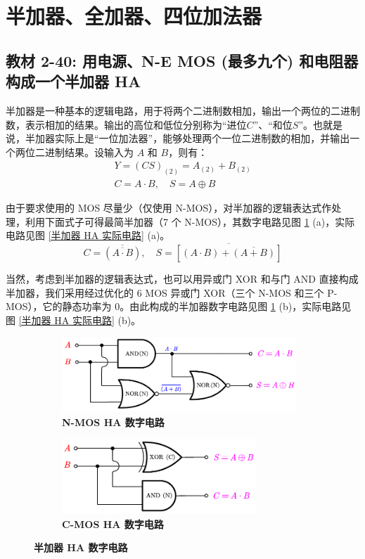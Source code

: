 \documentclass[UTF8]{report}
\theoremstyle{MyLineTheoremStyle} %
\theoremstyle{MyBlockTheoremStyle} %
\theoremstyle{MySubsubsectionStyle} %
\begin{document}
\section{半加器、全加器、四位加法器}

\subsection{教材 2-40: 用电源、N-E MOS (最多九个) 和电阻器构成一个半加器 HA}

半加器是一种基本的逻辑电路，用于将两个二进制数相加，输出一个两位的二进制数，表示相加的结果。输出的高位和低位分别称为“进位$C$”、“和位$S$”。也就是说，半加器实际上是“一位加法器”，能够处理两个一位二进制数的相加，并输出一个两位二进制结果。设输入为 $A$ 和 $B$，则有：
\begin{gather}
    Y = (C S)_{(2)} = A_{(2)} + B_{(2)}
    \\
    C = A \cdot B,\quad S = A \oplus B
\end{gather}

由于要求使用的 MOS 尽量少（仅使用 N-MOS），对半加器的逻辑表达式作处理，利用下面式子可得最简半加器（7 个 N-MOS），其数字电路见图 \ref{半加器 HA 数字电路} (a)，实际电路见图 \ref{半加器 HA 实际电路} (a)。
\begin{equation}
    C = \overline{(\overline{A\cdot B})},\quad S = \overline{\left[(A \cdot B) + \overline{(A + B)}\right]}
\end{equation}

当然，考虑到半加器的逻辑表达式，也可以用异或门 XOR 和与门 AND 直接构成半加器，我们采用经过优化的 6 MOS 异或门 XOR（三个 N-MOS 和三个 P-MOS），它的静态功率为 0。由此构成的半加器数字电路见图 \ref{半加器 HA 数字电路} (b)，实际电路见图 \ref{半加器 HA 实际电路} (b)。

\begin{figure}[H]\centering
\begin{subfigure}[t]{0.5\columnwidth}\centering
    \includegraphics[height=80pt]{assets/5/NMOS 半加器数字电路.pdf}
    \caption{\bfseries N-MOS HA 数字电路}
\end{subfigure}\hfill
\begin{subfigure}[t]{0.5\columnwidth}\centering
    \includegraphics[height=80pt]{assets/5/CMOS 半加器数字电路.pdf}
    \caption{\bfseries C-MOS HA 数字电路 }
\end{subfigure}
\caption{\bfseries 半加器 HA 数字电路 }\label{半加器 HA 数字电路}
\end{figure}
\end{document}
